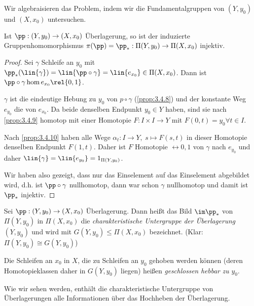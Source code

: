 \begin{bemn}[Strategie:]
Wir algebraisieren das Problem, indem wir die 
Fundamentalgruppen von $(Y,y_0)$ und $(X,x_0)$ untersuchen.
\end{bemn}

\begin{prop}
\label{prop:3.4.13}
Ist $\pp: (Y,y_0)\to (X,x_0)$ Überlagerung, so ist der induzierte
Gruppenhomomorphismus $\pi(\pp) = \pp_* : \Pi(Y,y_0) \to \Pi(X,x_0)$
injektiv.\fishhere
\end{prop}
\begin{proof}
Sei $\gamma$ Schleife an $y_0$ mit $\pp_*(\lin{\gamma}) = \lin{\pp\circ\gamma}
= \lin{e_{x_0}} \in\Pi(X,x_0)$. Dann ist $\pp\circ\gamma\hom e_{x_0}\rel{0,1}$.

$\gamma$ ist die eindeutige Hebung zu $y_0$ von $p\circ\gamma$
(\ref{prop:3.4.8}) und der konstante Weg $e_{y_0}$ die von $e_{x_0}$.
Da beide denselben Endpunkt $y_0\in Y$ haben, sind sie nach \ref{prop:3.4.9}
homotop mit einer Homotopie $F: I\times I\to Y$ mit $F(0,t) = y_0\forall t\in
I$.

Nach \ref{prop:3.4.10} haben alle Wege $\alpha_t: I\to Y,\; s\mapsto F(s,t)$ in
dieser Homotopie denselben Endpunkt $F(1,t)$. Daher ist $F$ Homotopie
$\rel{0,1}$ von $\gamma$ nach $e_{y_0}$ und daher $\lin{\gamma} = \lin{e_{y_0}}
= 1_{\Pi(Y,y_0)}$.

Wir haben also gezeigt, dass nur das Einselement auf das Einselement abgebildet
wird, d.h. ist $\pp\circ\gamma$ nullhomotop, dann war schon $\gamma$
nullhomotop und damit ist $\pp_*$ injektiv.\qedhere
\end{proof}

\begin{defn}
\label{defn:3.4.14}
Sei $\pp: (Y,y_0)\to (X,x_0)$ Überlagerung. Dann heißt das Bild $\im\pp_*$ von
$\Pi(Y,y_0)$ in $\Pi(X,x_0)$ die \emph{charakteristische Untergruppe der
Überlagerung $(Y,y_0)$} und wird mit $G(Y,y_0)\leqslant \Pi(X,x_0)$ bezeichnet.
(Klar: $\Pi(Y,y_0)\cong G(Y,y_0)$)

Die Schleifen an $x_0$ in $X$, die zu Schleifen an $y_0$ gehoben werden können
(deren Homotopieklassen daher in $G(Y,y_0)$ liegen) heißen \emph{geschlossen
hebbar zu $y_0$}.\fishhere
\end{defn}

Wie wir sehen werden, enthält die charakteristische Untergruppe von
Überlagerungen alle Informationen über das Hochheben der Überlagerung.

